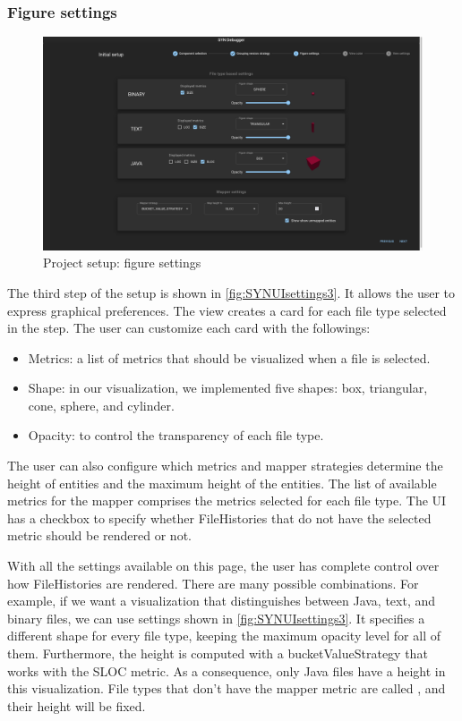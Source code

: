 \subsubsection*{Figure settings}

\begin{figure}[h]
    \center
    \includegraphics[width=\textwidth]{SYNUI-settings3.png}
    \caption{Project setup: figure settings}
    \label{fig:SYNUIsettings3}
\end{figure}

The third step of the setup is shown in \autoref{fig:SYNUIsettings3}. It allows the user to express graphical preferences. 
The view creates a card for each file type selected in the  step.
The user can customize each card with the followings:
\begin{itemize}
    \item Metrics: a list of metrics that should be visualized when a file is selected. 
    \item Shape: in our visualization, we implemented five shapes: box, triangular, cone, sphere, and cylinder. 
    \item Opacity: to control the transparency of each file type.
\end{itemize}

The user can also configure which metrics and mapper strategies determine the height of entities and the maximum height of the entities. 
The list of available metrics for the mapper comprises the metrics selected for each file type.
The UI has a checkbox to specify whether FileHistories that do not have the selected metric should be rendered or not. 

With all the settings available on this page, the user has complete control over how FileHistories are rendered. 
There are many possible combinations. For example, if we want a visualization that distinguishes between Java, text, and binary files, we can use settings shown in \autoref{fig:SYNUIsettings3}. It specifies a different shape for every file type, keeping the maximum opacity level for all of them. Furthermore, the height is computed with a bucketValueStrategy that works with the SLOC metric. As a consequence, only Java files have a height in this visualization. File types that don't have the mapper metric are called , and their height will be fixed. 

